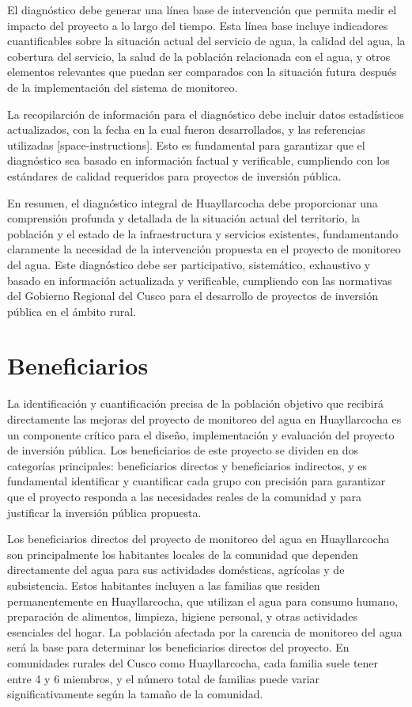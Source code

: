 El diagnóstico debe generar una línea base de intervención que permita medir el impacto del proyecto a lo largo del tiempo. Esta línea base incluye indicadores cuantificables sobre la situación actual del servicio de agua, la calidad del agua, la cobertura del servicio, la salud de la población relacionada con el agua, y otros elementos relevantes que puedan ser comparados con la situación futura después de la implementación del sistema de monitoreo.

La recopilarción de información para el diagnóstico debe incluir datos estadísticos actualizados, con la fecha en la cual fueron desarrollados, y las referencias utilizadas [space-instructions]. Esto es fundamental para garantizar que el diagnóstico sea basado en información factual y verificable, cumpliendo con los estándares de calidad requeridos para proyectos de inversión pública.

En resumen, el diagnóstico integral de Huayllarcocha debe proporcionar una comprensión profunda y detallada de la situación actual del territorio, la población y el estado de la infraestructura y servicios existentes, fundamentando claramente la necesidad de la intervención propuesta en el proyecto de monitoreo del agua. Este diagnóstico debe ser participativo, sistemático, exhaustivo y basado en información actualizada y verificable, cumpliendo con las normativas del Gobierno Regional del Cusco para el desarrollo de proyectos de inversión pública en el ámbito rural.


\section{Beneficiarios}

La identificación y cuantificación precisa de la población objetivo que recibirá directamente las mejoras del proyecto de monitoreo del agua en Huayllarcocha es un componente crítico para el diseño, implementación y evaluación del proyecto de inversión pública. Los beneficiarios de este proyecto se dividen en dos categorías principales: beneficiarios directos y beneficiarios indirectos, y es fundamental identificar y cuantificar cada grupo con precisión para garantizar que el proyecto responda a las necesidades reales de la comunidad y para justificar la inversión pública propuesta.

Los beneficiarios directos del proyecto de monitoreo del agua en Huayllarcocha son principalmente los habitantes locales de la comunidad que dependen directamente del agua para sus actividades domésticas, agrícolas y de subsistencia. Estos habitantes incluyen a las familias que residen permanentemente en Huayllarcocha, que utilizan el agua para consumo humano, preparación de alimentos, limpieza, higiene personal, y otras actividades esenciales del hogar. La población afectada por la carencia de monitoreo del agua será la base para determinar los beneficiarios directos del proyecto. En comunidades rurales del Cusco como Huayllarcocha, cada familia suele tener entre 4 y 6 miembros, y el número total de familias puede variar significativamente según la tamaño de la comunidad.

